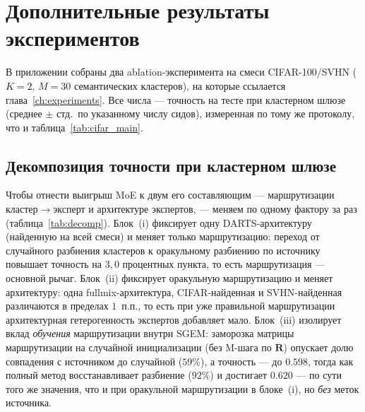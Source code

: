 \chapter{Дополнительные результаты экспериментов}
\label{app:experiments}

В приложении собраны два ablation-эксперимента на смеси CIFAR-100/SVHN
($K=2$, $M=30$ семантических кластеров), на которые ссылается
глава~\ref{ch:experiments}. Все числа --- точность на тесте при кластерном
шлюзе (среднее $\pm$ стд.\ по указанному числу сидов), измеренная по тому
же протоколу, что и таблица~\ref{tab:cifar_main}.

\section{Декомпозиция точности при кластерном шлюзе}
\label{app:decomp}

Чтобы отнести выигрыш MoE к двум его составляющим --- маршрутизации
кластер$\to$эксперт и архитектуре экспертов, --- меняем по одному фактору
за раз (таблица~\ref{tab:decomp}). Блок~(i) фиксирует одну
DARTS-архитектуру (найденную на всей смеси) и меняет только
маршрутизацию: переход от случайного разбиения кластеров к оракульному
разбиению по источнику повышает точность на $3{,}0$ процентных пункта,
то есть маршрутизация --- основной рычаг. Блок~(ii) фиксирует оракульную
маршрутизацию и меняет архитектуру: одна fullmix-архитектура,
CIFAR-найденная и SVHN-найденная различаются в пределах $1$~п.п., то есть
при уже правильной маршрутизации архитектурная гетерогенность экспертов
добавляет мало. Блок~(iii) изолирует вклад \emph{обучения} маршрутизации
внутри SGEM: заморозка матрицы маршрутизации на случайной инициализации
(без M-шага по $\mathbf{R}$) опускает долю совпадения с источником до
случайной ($59\%$), а точность --- до $0.598$, тогда как полный метод
восстанавливает разбиение ($92\%$) и достигает $0.620$ --- по сути того
же значения, что и при оракульной маршрутизации в блоке~(i), но
\emph{без} меток источника.

